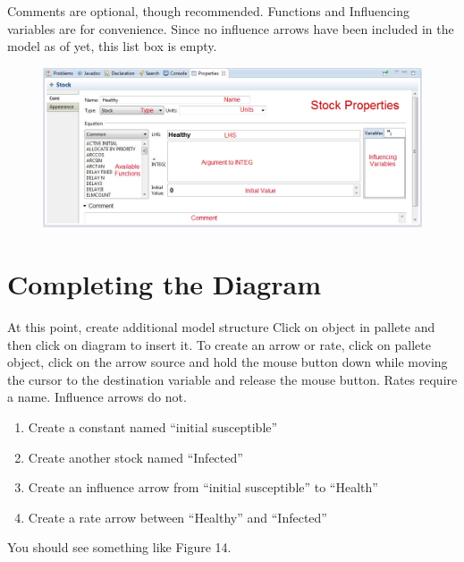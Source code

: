 \documentclass[11pt]{amsart}
\begin{document}
Comments are optional, though recommended.  Functions and Influencing variables are for convenience. Since no influence arrows have been included in the model as of yet, this list box is empty.






\begin{figure}[ht]
\begin{center}
\vspace{.2in}
\centerline {
\includegraphics[totalheight=0.4\textheight]{images/013.jpg}
}
\caption{}
\label{fig:013}
\end{center}
\end{figure}

\clearpage

\section{Completing the Diagram}
At this point, create additional model structure Click on object in pallete and then click on diagram to insert it. To create an arrow or rate, click on pallete object, click on the arrow source and hold the mouse button down while moving the cursor to the destination variable and release the mouse button. Rates require a name. Influence arrows do not.

\begin{enumerate}
\item Create a constant named “initial susceptible”
\item Create another stock named “Infected”
\item Create an influence arrow from “initial susceptible” to “Health”
\item Create a rate arrow between “Healthy” and “Infected”
\end{enumerate}
\vspace{.2in}

You should see something like Figure 14.
\end{document}
